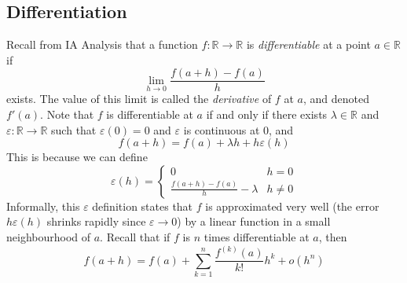 \subsection{Differentiation}
Recall from IA Analysis that a function \( f \colon \mathbb R \to \mathbb R \) is \textit{differentiable} at a point \( a \in \mathbb R \) if
\[
	\lim_{h \to 0} \frac{f(a+h) - f(a)}{h}
\]
exists.
The value of this limit is called the \textit{derivative} of \( f \) at \( a \), and denoted \( f'(a) \).
Note that \( f \) is differentiable at \( a \) if and only if there exists \( \lambda \in \mathbb R \) and \( \varepsilon \colon \mathbb R \to \mathbb R \) such that \( \varepsilon(0) = 0 \) and \( \varepsilon \) is continuous at \( 0 \), and
\[
	f(a+h) = f(a) + \lambda h + h \varepsilon(h)
\]
This is because we can define
\[
	\varepsilon(h) = \begin{cases}
		0                                 & h = 0    \\
		\frac{f(a+h) - f(a)}{h} - \lambda & h \neq 0
	\end{cases}
\]
Informally, this \( \varepsilon \) definition states that \( f \) is approximated very well (the error \( h\varepsilon(h) \) shrinks rapidly since \( \varepsilon \to 0 \)) by a linear function in a small neighbourhood of \( a \).
Recall that if \( f \) is \( n \) times differentiable at \( a \), then
\[
	f(a+h) = f(a) + \sum_{k=1}^n \frac{f^{(k)}(a)}{k!}h^k + o(h^n)
\]
